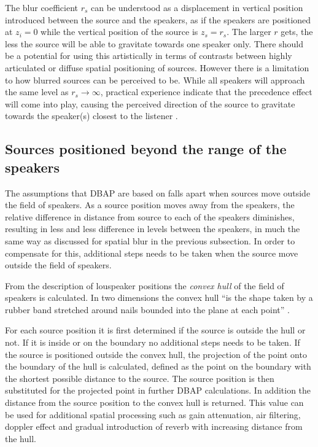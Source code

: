 \documentclass[twoside,10pt]{article}
\begin{document}
The blur coefficient $r_{s}$ can be understood as a displacement in vertical position introduced between the source and the speakers, as if the speakers are positioned at $z_{i}=0$ while the vertical position of the source is $z_{s}=r_{s}$. The larger $r$ gets, the less the source will be able to gravitate towards one speaker only. There should be a potential for using this artistically in terms of contrasts between highly articulated or diffuse spatial positioning of sources. However there is a limitation to how blurred sources can be perceived to be. While all speakers will approach the same level as $ r_{s} \rightarrow \infty $, practical experience indicate that the precedence effect will come into play, causing the perceived direction of the source to gravitate towards the speaker(s) closest to the listener \cite{Litovsky:1999precedence_effect}.




\subsection{Sources positioned beyond the range of the speakers}


The assumptions that DBAP are based on falls apart when sources move outside the field of speakers. As a source position moves away from the speakers, the relative difference in distance from source to each of the speakers diminishes, resulting in less and less difference in levels between the speakers, in much the same way as discussed for spatial blur in the previous subsection. In order to compensate for this, additional steps needs to be taken when the source move outside the field of speakers.

From the description of louspeaker positions the \emph{convex hull} of the field of speakers is calculated. In two dimensions the convex hull ``is the shape taken by a rubber band stretched around nails bounded into the plane at each point'' \cite{Rourke:1998_geometry}.

For each source position it is first determined if the source is outside the hull or not. If it is inside or on the boundary no additional steps needs to be taken. If the source is positioned outside the convex hull, the projection of the point onto the boundary of the hull is calculated, defined as the point on the boundary with the shortest possible distance to the source. The source position is then substituted for the projected point in further DBAP calculations. In addition the distance from the source position to the convex hull is returned. This value can be used for additional spatial processing such as gain attenuation, air filtering, doppler effect and gradual introduction of reverb with increasing distance from the hull.
\end{document}
